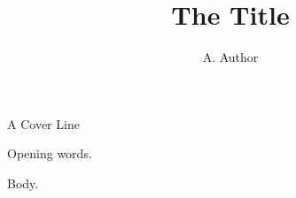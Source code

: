 \documentclass{article}
\title{The Title}
\author{A. Author}
\begin{document}
\begin{titlepage}
\centering A Cover Line
\end{titlepage}
Opening words.
\maketitle
Body.
\end{document}
